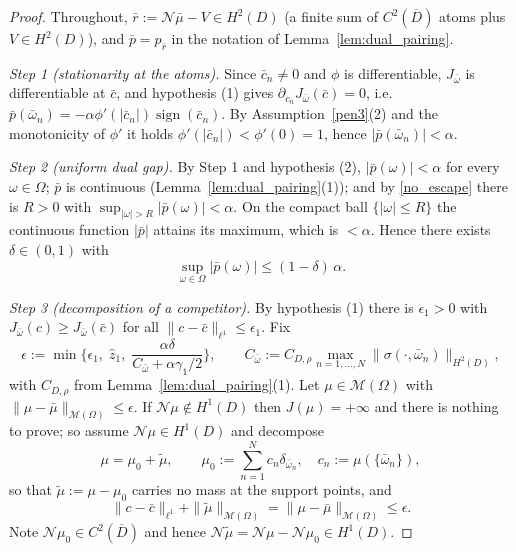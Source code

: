 \documentclass[11pt]{amsart}
\theoremstyle{definition}
\theoremstyle{remark}
\DeclareMathOperator{\sign}{sign}
\begin{document}
\begin{proof}
Throughout, $\bar{r} := \mathcal{N}\bar{\mu} - V \in H^2(D)$ (a finite sum of
$C^2(\overline{D})$ atoms plus $V \in H^2(D)$), and $\bar{p} = p_{\bar{r}}$ in
the notation of Lemma~\ref{lem:dual_pairing}.

\emph{Step 1 (stationarity at the atoms).} Since $\bar{c}_n \neq 0$ and $\phi$
is differentiable, $J_{\bar{\omega}}$ is differentiable at $\bar{c}$, and
hypothesis (1) gives $\partial_{c_n} J_{\bar{\omega}}(\bar{c}) = 0$, i.e.
$\bar{p}(\bar{\omega}_n) = -\alpha \phi'(|\bar{c}_n|) \sign(\bar{c}_n)$. By
Assumption~\ref{pen3}(2) and the monotonicity of $\phi'$ it holds
$\phi'(|\bar{c}_n|) < \phi'(0) = 1$, hence $|\bar{p}(\bar{\omega}_n)| < \alpha$.

\emph{Step 2 (uniform dual gap).} By Step 1 and hypothesis (2),
$|\bar{p}(\omega)| < \alpha$ for every $\omega \in \Omega$; $\bar{p}$ is
continuous (Lemma~\ref{lem:dual_pairing}(1)); and by \eqref{no_escape} there is
$R > 0$ with $\sup_{|\omega| > R} |\bar{p}(\omega)| < \alpha$. On the compact
ball $\{|\omega| \le R\}$ the continuous function $|\bar{p}|$ attains its
maximum, which is $< \alpha$. Hence there exists $\delta \in (0, 1)$ with
\begin{equation*}
	\sup_{\omega \in \Omega} |\bar{p}(\omega)| \le (1 - \delta)\, \alpha .
\end{equation*}

\emph{Step 3 (decomposition of a competitor).} By hypothesis (1) there is
$\epsilon_1 > 0$ with $J_{\bar{\omega}}(c) \ge J_{\bar{\omega}}(\bar{c})$ for
all $\|c - \bar{c}\|_{\ell^1} \le \epsilon_1$. Fix
\begin{equation*}
	\epsilon := \min\bigg\{ \epsilon_1, \; \hat{z}_1, \;
	\frac{\alpha \delta}{C_{\bar{\omega}} + \alpha \gamma_1 / 2} \bigg\},
	\qquad
	C_{\bar{\omega}} := C_{D, \rho} \max_{n = 1, \dots, N}
	\|\sigma(\cdot, \bar{\omega}_n)\|_{H^2(D)},
\end{equation*}
with $C_{D,\rho}$ from Lemma~\ref{lem:dual_pairing}(1). Let $\mu \in
\mathcal{M}(\Omega)$ with $\|\mu - \bar{\mu}\|_{\mathcal{M}(\Omega)} \le
\epsilon$. If $\mathcal{N}\mu \notin H^1(D)$ then $J(\mu) = +\infty$ and there
is nothing to prove; so assume $\mathcal{N}\mu \in H^1(D)$ and decompose
\begin{equation*}
	\mu = \mu_0 + \tilde{\mu}, \qquad
	\mu_0 := \sum_{n = 1}^N c_n \delta_{\bar{\omega}_n}, \quad
	c_n := \mu(\{\bar{\omega}_n\}),
\end{equation*}
so that $\tilde{\mu} := \mu - \mu_0$ carries no mass at the support points, and
\begin{equation*}
	\|c - \bar{c}\|_{\ell^1} + \|\tilde{\mu}\|_{\mathcal{M}(\Omega)}
	= \|\mu - \bar{\mu}\|_{\mathcal{M}(\Omega)} \le \epsilon .
\end{equation*}
Note $\mathcal{N}\mu_0 \in C^2(\overline{D})$ and hence
$\mathcal{N}\tilde{\mu} = \mathcal{N}\mu - \mathcal{N}\mu_0 \in H^1(D)$.


\end{proof}
\end{document}
